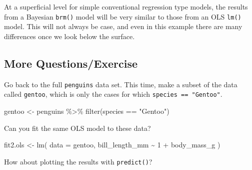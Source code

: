 \documentclass[
  letterpaper,
  DIV=11,
  numbers=noendperiod]{scrartcl}
\newenvironment{Shaded}{\begin{snugshade}}{\end{snugshade}}
\newcommand{\AttributeTok}[1]{\textcolor[rgb]{0.40,0.45,0.13}{#1}}
\newcommand{\DecValTok}[1]{\textcolor[rgb]{0.68,0.00,0.00}{#1}}
\newcommand{\FunctionTok}[1]{\textcolor[rgb]{0.28,0.35,0.67}{#1}}
\newcommand{\NormalTok}[1]{\textcolor[rgb]{0.00,0.23,0.31}{#1}}
\newcommand{\OtherTok}[1]{\textcolor[rgb]{0.00,0.23,0.31}{#1}}
\newcommand{\SpecialCharTok}[1]{\textcolor[rgb]{0.37,0.37,0.37}{#1}}
\newcommand{\StringTok}[1]{\textcolor[rgb]{0.13,0.47,0.30}{#1}}
\begin{document}
At a superficial level for simple conventional regression type models,
the results from a Bayesian \texttt{brm()} model will be very similar to
those from an OLS \texttt{lm()} model. This will not always be case, and
even in this example there are many differences once we look below the
surface.

\subsection{More Questions/Exercise}\label{more-questionsexercise}

Go back to the full \texttt{penguins} data set. This time, make a subset
of the data called \texttt{gentoo}, which is only the cases for which
\texttt{species\ ==\ "Gentoo"}.

\begin{Shaded}
\begin{Highlighting}[]
\NormalTok{gentoo }\OtherTok{\textless{}{-}}\NormalTok{ penguins }\SpecialCharTok{\%\textgreater{}\%} 
  \FunctionTok{filter}\NormalTok{(species }\SpecialCharTok{==} \StringTok{"Gentoo"}\NormalTok{)}
\end{Highlighting}
\end{Shaded}

Can you fit the same OLS model to these data?

\begin{Shaded}
\begin{Highlighting}[]
\NormalTok{fit2.ols }\OtherTok{\textless{}{-}} \FunctionTok{lm}\NormalTok{(}
  \AttributeTok{data =}\NormalTok{ gentoo,}
\NormalTok{  bill\_length\_mm }\SpecialCharTok{\textasciitilde{}} \DecValTok{1} \SpecialCharTok{+}\NormalTok{ body\_mass\_g}
\NormalTok{)}
\end{Highlighting}
\end{Shaded}

How about plotting the results with \texttt{predict()}?
\end{document}
